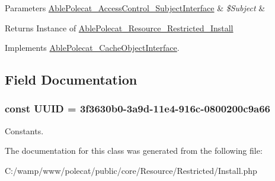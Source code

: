 \begin{DoxyParams}[1]{Parameters}
\hyperlink{interface_able_polecat___access_control___subject_interface}{Able\+Polecat\+\_\+\+Access\+Control\+\_\+\+Subject\+Interface} & {\em \$\+Subject} & \\
\hline
\end{DoxyParams}
\begin{DoxyReturn}{Returns}
Instance of \hyperlink{class_able_polecat___resource___restricted___install}{Able\+Polecat\+\_\+\+Resource\+\_\+\+Restricted\+\_\+\+Install} 
\end{DoxyReturn}


Implements \hyperlink{interface_able_polecat___cache_object_interface_a3f2135f6ad45f51d075657f6d20db2cd}{Able\+Polecat\+\_\+\+Cache\+Object\+Interface}.



\subsection{Field Documentation}
\hypertarget{class_able_polecat___resource___restricted___install_a74b892c8c0b86bf9d04c5819898c51e7}{}
\subsubsection[{U\+U\+I\+D}]{\setlength{\rightskip}{0pt plus 5cm}const U\+U\+I\+D = \textquotesingle{}3f3630b0-\/3a9d-\/11e4-\/916c-\/0800200c9a66\textquotesingle{}}\label{class_able_polecat___resource___restricted___install_a74b892c8c0b86bf9d04c5819898c51e7}
Constants. 

The documentation for this class was generated from the following file\+:\begin{DoxyCompactItemize}
\item 
C\+:/wamp/www/polecat/public/core/\+Resource/\+Restricted/Install.\+php\end{DoxyCompactItemize}

